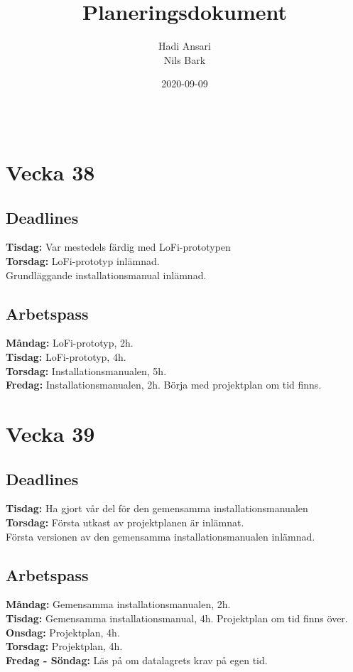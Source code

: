 \documentclass{TDP003mall}
\author{Hadi Ansari\\ Nils Bark}
\title{Planeringsdokument}
\date{2020-09-09}
\begin{document}
\projectpage
\begin{table}[!h]
\begin{tabularx}{\linewidth}{|l|X|l|}

\end{tabularx}
\end{table}


\section*{Vecka 38}

\subsection*{Deadlines}
\textbf{Tisdag: }Var mestedels färdig med LoFi-prototypen\\
\textbf{Torsdag: }LoFi-prototyp inlämnad.\\
\-\hspace{47pt}Grundläggande installationsmanual inlämnad.

\subsection*{Arbetspass}
\textbf{Måndag: }LoFi-prototyp, 2h.\\
\textbf{Tisdag: }LoFi-prototyp, 4h. \\
\textbf{Torsdag: }Installationsmanualen, 5h.\\
\textbf{Fredag: }Installationsmanualen, 2h. Börja med projektplan om tid finns.


\section*{Vecka 39}
\subsection*{Deadlines}
\textbf{Tisdag: }Ha gjort vår del för den gemensamma installationsmanualen\\
\textbf{Torsdag: }Första utkast av projektplanen är inlämnat.\\
\-\hspace{47pt}Första versionen av den gemensamma installationsmanualen inlämnad.

\subsection*{Arbetspass}
\textbf{Måndag: }Gemensamma installationsmanualen, 2h.\\
\textbf{Tisdag: }Gemensamma installationsmanual, 4h. Projektplan om tid finns över.\\
\textbf{Onsdag: }Projektplan, 4h.\\
\textbf{Torsdag: }Projektplan, 4h. \\
\textbf{Fredag - Söndag: }Läs på om datalagrets krav på egen tid.
\end{document}
